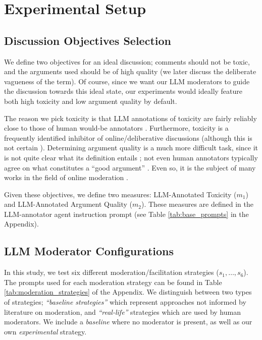 \section{Experimental Setup}

\subsection{Discussion Objectives Selection}

We define two objectives for an ideal discussion; comments should not be toxic, and the arguments used should be of high quality (we later discuss the deliberate vagueness of the term). Of course, since we want our \ac{LLM} moderators to guide the discussion towards this ideal state, our experiments would ideally feature both high toxicity and low argument quality by default. 

The reason we pick toxicity is that \ac{LLM} annotations of toxicity are fairly reliably close to those of human would-be annotators \parencite{kang-qian-2024-implanting, Wang2022ToxicityDW, anjum2024hate}. Furthermore, toxicity is a frequently identified inhibitor of online/deliberative discussions \parencite{dekock2022disagree, XiaToxicity} (although this is not certain \parencite{Avalle2024PersistentIP}). Determining argument quality is a much more difficult task, since it is not quite clear what its definition entails \cite{korre2025evaluation}; not even human annotators typically agree on what constitutes a “good argument” \cite{argyle2023}. Even so, it is the subject of many works in the field of online moderation \cite{argyle2023, schroeder-etal-2024-fora, falk-etal-2024-moderation, falk-etal-2021-predicting}.

Given these objectives, we define two measures: \ac{LLM}-Annotated Toxicity ($m_1$) and \ac{LLM}-Annotated Argument Quality ($m_2$). These measures are defined in the \ac{LLM}-annotator agent instruction prompt (see Table \ref{tab:base_prompts} in the Appendix).


\subsection{LLM Moderator Configurations}
\label{ssec:setup:strategies}

In this study, we test six different moderation/facilitation strategies ($s_1, \ldots, s_6$). The prompts used for each moderation strategy can be found in Table \ref{tab:moderation_strategies} of the Appendix. We distinguish between two types of strategies; \emph{“baseline strategies”} which represent approaches not informed by literature on moderation, and \emph{“real-life”} strategies which are used by human moderators. We include a \emph{baseline} where no moderator is present, as well as our own \emph{experimental} strategy.

